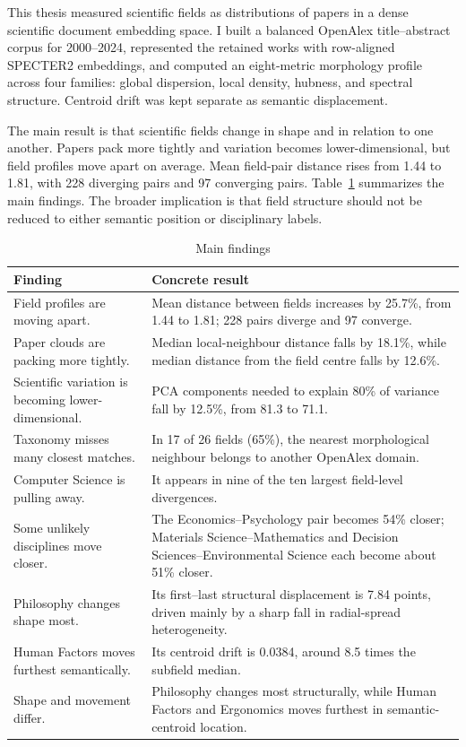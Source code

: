 
This thesis measured scientific fields as distributions of papers in a dense scientific document embedding space. I built a balanced OpenAlex title--abstract corpus for 2000--2024, represented the retained works with row-aligned SPECTER2 embeddings, and computed an eight-metric morphology profile across four families: global dispersion, local density, hubness, and spectral structure. Centroid drift was kept separate as semantic displacement.

The main result is that scientific fields change in shape and in relation to one another. Papers pack more tightly and variation becomes lower-dimensional, but field profiles move apart on average. Mean field-pair distance rises from 1.44 to 1.81, with 228 diverging pairs and 97 converging pairs. Table~\ref{tab:main_findings} summarizes the main findings. The broader implication is that field structure should not be reduced to either semantic position or disciplinary labels.

\begin{table}[H]
\centering
\caption[Main findings]{Main findings}
\label{tab:main_findings}
\footnotesize
\setlength{\tabcolsep}{6pt}
\setlength{\extrarowheight}{1.5pt}
\renewcommand{\arraystretch}{1.12}
\begin{tabular}{@{}p{}p{}@{}}
\hline
Finding & Concrete result \\
\hline
Field profiles are moving apart. & Mean distance between fields increases by 25.7\%, from 1.44 to 1.81; 228 pairs diverge and 97 converge. \\
Paper clouds are packing more tightly. & Median local-neighbour distance falls by 18.1\%, while median distance from the field centre falls by 12.6\%. \\
Scientific variation is becoming lower-dimensional. & PCA components needed to explain 80\% of variance fall by 12.5\%, from 81.3 to 71.1. \\
Taxonomy misses many closest matches. & In 17 of 26 fields (65\%), the nearest morphological neighbour belongs to another OpenAlex domain. \\
Computer Science is pulling away. & It appears in nine of the ten largest field-level divergences. \\
Some unlikely disciplines move closer. & The Economics--Psychology pair becomes 54\% closer; Materials Science--Mathematics and Decision Sciences--Environmental Science each become about 51\% closer. \\
Philosophy changes shape most. & Its first--last structural displacement is 7.84 points, driven mainly by a sharp fall in radial-spread heterogeneity. \\
Human Factors moves furthest semantically. & Its centroid drift is 0.0384, around 8.5 times the subfield median. \\
Shape and movement differ. & Philosophy changes most structurally, while Human Factors and Ergonomics moves furthest in semantic-centroid location. \\
\hline
\end{tabular}
\end{table}

